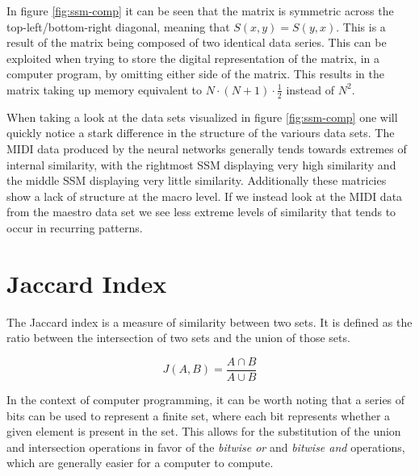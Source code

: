 \documentclass[a4paper]{article}
\begin{document}
In figure \ref{fig:ssm-comp} it can be seen that the matrix is symmetric across the top-left/bottom-right diagonal, meaning that $S(x,y)=S(y,x)$. This is a result of the matrix being composed of two identical data series. This can be exploited when trying to store the digital representation of the matrix, in a computer program, by omitting either side of the matrix. This results in the matrix taking up memory equivalent to $N \cdot (N+1) \cdot \frac{1}{2}$ instead of $N^2$.

When taking a look at the data sets visualized in figure \ref{fig:ssm-comp} one will quickly notice a stark difference in the structure of the variours data sets. The MIDI data produced by the neural networks generally tends towards extremes of internal similarity, with the rightmost SSM displaying very high similarity and the middle SSM displaying very little similarity. Additionally these matricies show a lack of structure at the macro level. If we instead look at the MIDI data from the maestro data set we see less extreme levels of similarity that tends to occur in recurring patterns.

\section{Jaccard Index}\label{sec:theory-jaccard}

The Jaccard index is a measure of similarity between two sets. It is defined as the ratio between the intersection of two sets and the union of those sets. \cite{jaccard}

\[ J(A,B) = \frac{ A \cap B }{ A \cup B} \]

In the context of computer programming, it can be worth noting that a series of bits can be used to represent a finite set, where each bit represents whether a given element is present in the set. This allows for the substitution of the union and intersection operations in favor of the \textit{bitwise or} and \textit{bitwise and} operations, which are generally easier for a computer to compute.

\printbibliography

%
%
\end{document}
